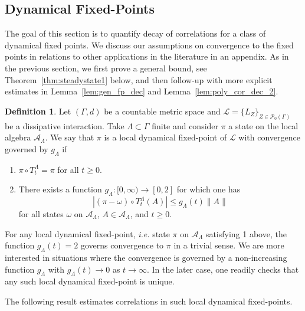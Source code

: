 \documentclass{article}
\newcommand{\A}{\mathcal{A}}
\newcommand{\<}{\langle}
\renewcommand{\>}{\rangle}
\numberwithin{equation}{section}
\theoremstyle{definition}
\newtheorem{define}[thm]{Definition}
\begin{document}
\subsection{Dynamical Fixed-Points}\label{sec:dynamicalsteadystates}

The goal of this section is to quantify decay of correlations for a class of
dynamical fixed points. We discuss our assumptions on convergence to the fixed points
in relations to other applications in the literature in an appendix. As in the previous section, we first prove
a general bound, see Theorem~\ref{thm:steadystate1} below, and then follow-up with more explicit estimates in 
Lemma~\ref{lem:gen_fp_dec} and Lemma~\ref{lem:poly_cor_dec_2}. 

\begin{define}\label{def:steadystate}
Let $(\Gamma, d)$ be a countable metric space and $\mathscr{L}= \{ L_Z \}_{Z \in \mathcal{P}_0(\Gamma)}$ be a dissipative interaction.
Take $\Lambda \subset \Gamma$ finite and consider $\pi$ a state on the local algebra $\A_{\Lambda}$.
We say that $\pi$ is a local dynamical fixed-point of $\mathscr{L}$ with convergence governed by $g_{\Lambda}$ if
        \begin{enumerate}
            \item $\pi \circ T^{\Lambda}_t = \pi$ for all $t\ge 0$. 
            \item There exists a function $g_\Lambda:[0,\infty) \to [0,2]$ for which one has 
            \[ | (\pi - \omega)\circ T^{\Lambda}_t(A) | \le g_\Lambda(t) \| A\| \] 
            for all states $\omega$ on $\A_{\Lambda}$, $A \in \A_{\Lambda}$, and $t \geq 0$.
        \end{enumerate}  
\end{define}  

For any local dynamical fixed-point, \textit{i.e.} state $\pi$ on $\A_{\Lambda}$ satisfying 1 above, the function
$g_{\Lambda}(t) =2$ governs convergence to $\pi$ in a trivial sense. We are more interested
in situations where the convergence is governed by a non-increasing function $g_{\Lambda}$ with
$g_{\Lambda}(t) \to 0$ as $t \to \infty$. In the later case, one readily checks that any such local dynamical fixed-point is
unique. 

The following result estimates correlations in such local dynamical fixed-points.
\end{document}
